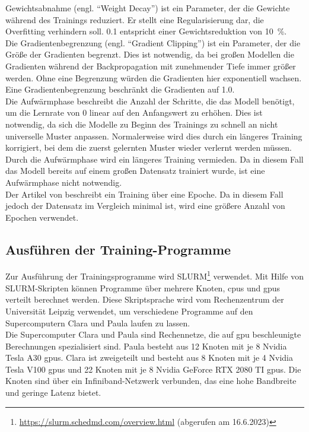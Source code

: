 Gewichtsabnahme (engl. \enquote{Weight Decay}) ist ein Parameter, der die Gewichte während des Trainings reduziert.
Er stellt eine Regularisierung dar, die Overfitting verhindern soll.
\SI{0,1}{} entspricht einer Gewichtsreduktion von \SI{10}{\percent}.\\

Die Gradientenbegrenzung (engl. \enquote{Gradient Clipping}) ist ein Parameter, der die Größe der Gradienten begrenzt.
Dies ist notwendig, da bei großen Modellen die Gradienten während der Backpropagation mit zunehmender Tiefe immer größer werden.
Ohne eine Begrenzung würden die Gradienten hier exponentiell wachsen.
Eine Gradientenbegrenzung beschränkt die Gradienten auf \SI{1,0}{}.\\

Die Aufwärmphase beschreibt die Anzahl der Schritte, die das Modell benötigt, um die Lernrate von $0$ linear auf den Anfangswert zu erhöhen.
Dies ist notwendig, da sich die Modelle zu Beginn des Trainings zu schnell an nicht universelle Muster anpassen.
Normalerweise wird dies durch ein längeres Training korrigiert, bei dem die zuerst gelernten Muster wieder verlernt werden müssen.
Durch die Aufwärmphase wird ein längeres Training vermieden.
Da in diesem Fall das Modell bereits auf einem großen Datensatz trainiert wurde, ist eine Aufwärmphase nicht notwendig.\\

Der Artikel von \citet{llama} beschreibt ein Training über eine Epoche.
Da in diesem Fall jedoch der Datensatz im Vergleich minimal ist, wird eine größere Anzahl von Epochen verwendet.\\

\subsection{Ausführen der Training-Programme}\label{sec:approach:training}

Zur Ausführung der Trainingsprogramme wird SLURM\footnote{\url{https://slurm.schedmd.com/overview.html} (abgerufen am 16.6.2023)} verwendet.
Mit Hilfe von SLURM-Skripten können Programme über mehrere Knoten, \ac{cpu}s und \ac{gpu}s verteilt berechnet werden.
Diese Skriptsprache wird vom Rechenzentrum der Universität Leipzig verwendet, um verschiedene Programme auf den Supercomputern Clara und Paula laufen zu lassen.\\

Die Supercomputer Clara und Paula sind Rechennetze, die auf \ac{gpu} beschleunigte Berechnungen spezialisiert sind.
Paula besteht aus 12 Knoten mit je 8 Nvidia Tesla A30 \ac{gpu}s.
Clara ist zweigeteilt und besteht aus 8 Knoten mit je 4 Nvidia Tesla V100 \ac{gpu}s und 22 Knoten mit je 8 Nvidia GeForce RTX 2080 TI \ac{gpu}s.
Die Knoten sind über ein Infiniband-Netzwerk verbunden, das eine hohe Bandbreite und geringe Latenz bietet.\\

